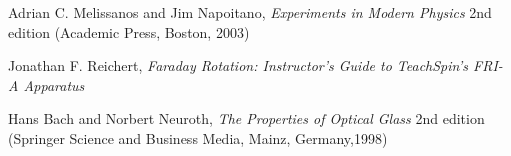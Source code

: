\documentclass[prb,preprint]{revtex4-1}
\begin{document}
\begin{thebibliography}{3}

 Adrian C. Melissanos and Jim Napoitano, \textit{Experiments in Modern Physics} 2nd edition (Academic Press, Boston, 2003)

 Jonathan F. Reichert, \textit{Faraday Rotation: Instructor's Guide to TeachSpin's FRI-A Apparatus}

 Hans Bach and Norbert Neuroth, \textit{The Properties of Optical Glass} 2nd edition (Springer Science and Business Media, Mainz, Germany,1998)

\end{thebibliography}
\end{document}

